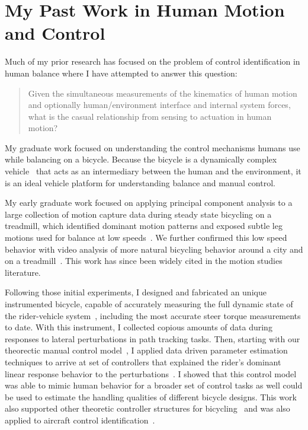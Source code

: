 \documentclass{article}
\begin{document}
\section*{My Past Work in Human Motion and Control}
%
Much of my prior research has focused on the problem of control identification
in human balance where I have attempted to answer this question:

\begin{quote}
  Given the simultaneous measurements of the kinematics of human motion and
  optionally human/environment interface and internal system forces, what is
  the casual relationship from sensing to actuation in human motion?
\end{quote}

My graduate work focused on understanding the control mechanisms humans use
while balancing on a bicycle. Because the bicycle is a dynamically complex
vehicle~\cite{Astrom2005,Meijaard2007,Moore2007,Moore2008} that acts as an
intermediary between the human and the environment, it is an ideal vehicle
platform for understanding balance and manual control.

My early graduate work focused on applying principal component analysis to a
large collection of motion capture data during steady state bicycling on a
treadmill, which identified dominant motion patterns and exposed subtle leg
motions used for balance at low speeds~\cite{Moore2009a,Moore2011c}. We further
confirmed this low speed behavior with video analysis of more natural bicycling
behavior around a city and on a treadmill~\cite{Kooijman2009}. This work has
since been widely cited in the motion studies literature.

Following those initial experiments, I designed and fabricated an unique
instrumented bicycle, capable of accurately measuring the full dynamic state of
the rider-vehicle system~\cite{Moore2012,Moore2013}, including the most
accurate steer torque measurements to date. With this instrument, I collected
copious amounts of data during responses to lateral perturbations in path
tracking tasks. Then, starting with our theorectic manual control
model~\cite{Hess2012}, I applied data driven parameter estimation techniques to
arrive at set of controllers that explained the rider's dominant linear
response behavior to the perturbations~\cite{Moore2012}. I showed that this
control model was able to mimic human behavior for a broader set of control
tasks as well could be used to estimate the handling qualities of different
bicycle designs. This work also supported other theoretic controller structures
for bicycling~\cite{Schwab2012a,Schwab2012,Schwab2013} and was also applied to
aircraft control identification~\cite{Hess2013}.
\end{document}
